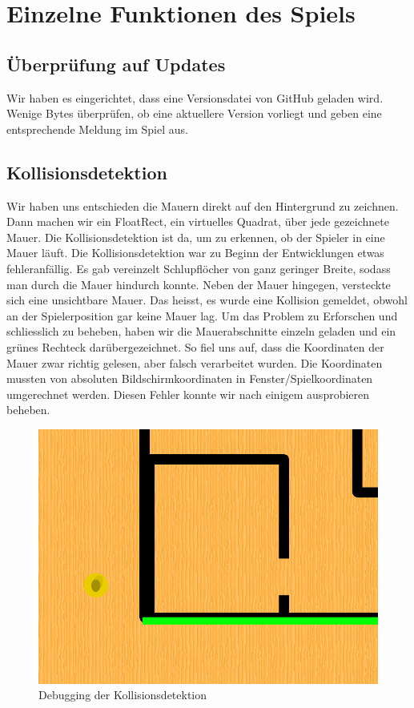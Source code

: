 \documentclass[11pt,a4paper]{scrbook}
\begin{document}
\newpage
\section{Einzelne Funktionen des Spiels}

\subsection{Überprüfung auf Updates}
Wir haben es eingerichtet, dass eine Versionsdatei von GitHub geladen wird. Wenige Bytes überprüfen, ob eine aktuellere Version vorliegt und geben eine entsprechende Meldung im Spiel aus.

\subsection{Kollisionsdetektion}
Wir haben uns entschieden die Mauern direkt auf den Hintergrund zu zeichnen. Dann machen wir ein FloatRect, ein virtuelles Quadrat,
über jede gezeichnete Mauer. Die Kollisionsdetektion ist da, um zu erkennen, ob der Spieler in eine Mauer läuft.
Die Kollisionsdetektion war zu Beginn der Entwicklungen etwas fehleranfällig. Es gab vereinzelt
Schlupflöcher von ganz geringer Breite, sodass man durch die Mauer hindurch konnte. Neben der Mauer hingegen,
versteckte sich eine unsichtbare Mauer. Das heisst, es wurde eine Kollision gemeldet, obwohl an der
Spielerposition gar keine Mauer lag. Um das Problem zu Erforschen und schliesslich zu beheben, haben
wir die Mauerabschnitte einzeln geladen und ein grünes Rechteck darübergezeichnet. So fiel uns auf, dass
die Koordinaten der Mauer zwar richtig gelesen, aber falsch verarbeitet wurden. Die Koordinaten mussten
von absoluten Bildschirmkoordinaten in Fenster/Spielkoordinaten umgerechnet werden. Diesen Fehler konnte wir nach einigem ausprobieren beheben.

\begin{figure}[h]
\centering
\includegraphics[scale=0.3]{img/kollisionsdetektion.png}
\caption{Debugging der Kollisionsdetektion}
\end{figure}
\end{document}
